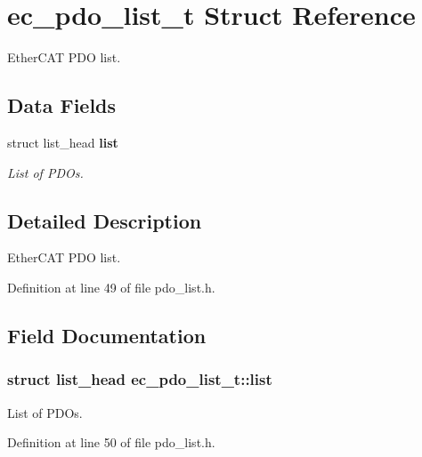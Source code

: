 \section{ec\-\_\-pdo\-\_\-list\-\_\-t \-Struct \-Reference}
\label{structec__pdo__list__t}


\-Ether\-C\-A\-T \-P\-D\-O list.  


\subsection*{\-Data \-Fields}
\begin{DoxyCompactItemize}
\item 
struct list\-\_\-head {\bf list}
\begin{DoxyCompactList}\small\item\em \-List of \-P\-D\-Os. \end{DoxyCompactList}\end{DoxyCompactItemize}


\subsection{\-Detailed \-Description}
\-Ether\-C\-A\-T \-P\-D\-O list. 

\-Definition at line 49 of file pdo\-\_\-list.\-h.



\subsection{\-Field \-Documentation}
\subsubsection[{list}]{\setlength{\rightskip}{0pt plus 5cm}struct list\-\_\-head {\bf ec\-\_\-pdo\-\_\-list\-\_\-t\-::list}}\label{structec__pdo__list__t_a7889b3f485d92c496fd15e45573cae21}


\-List of \-P\-D\-Os. 



\-Definition at line 50 of file pdo\-\_\-list.\-h.


